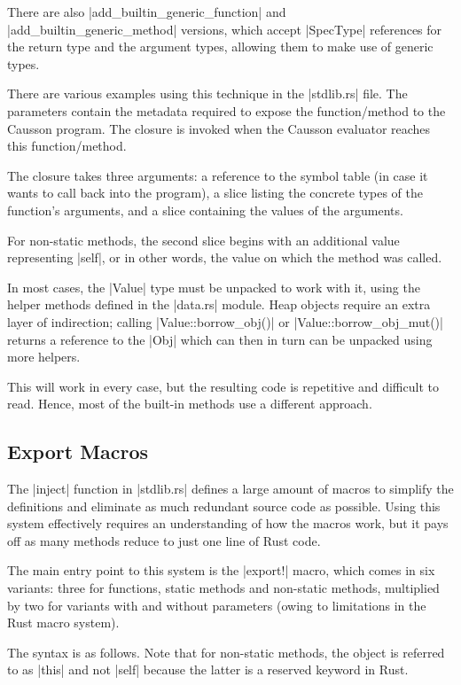 \documentclass[11pt]{report}
\begin{document}
There are also |add_builtin_generic_function| and |add_builtin_generic_method| versions, which accept |SpecType| references for the return type and the argument types, allowing them to make use of generic types.

There are various examples using this technique in the |stdlib.rs| file. The parameters contain the metadata required to expose the function/method to the Causson program. The closure is invoked when the Causson evaluator reaches this function/method.

The closure takes three arguments: a reference to the symbol table (in case it wants to call back into the program), a slice listing the concrete types of the function's arguments, and a slice containing the values of the arguments.

For non-static methods, the second slice begins with an additional value representing |self|, or in other words, the value on which the method was called.

In most cases, the |Value| type must be unpacked to work with it, using the helper methods defined in the |data.rs| module. Heap objects require an extra layer of indirection; calling |Value::borrow_obj()| or |Value::borrow_obj_mut()| returns a reference to the |Obj| which can then in turn can be unpacked using more helpers.

This will work in every case, but the resulting code is repetitive and difficult to read. Hence, most of the built-in methods use a different approach.

\subsection{Export Macros}

The |inject| function in |stdlib.rs| defines a large amount of macros to simplify the definitions and eliminate as much redundant source code as possible. Using this system effectively requires an understanding of how the macros work, but it pays off as many methods reduce to just one line of Rust code.

The main entry point to this system is the |export!| macro, which comes in six variants: three for functions, static methods and non-static methods, multiplied by two for variants with and without parameters (owing to limitations in the Rust macro system).

The syntax is as follows. Note that for non-static methods, the object is referred to as |this| and not |self| because the latter is a reserved keyword in Rust.
\end{document}
